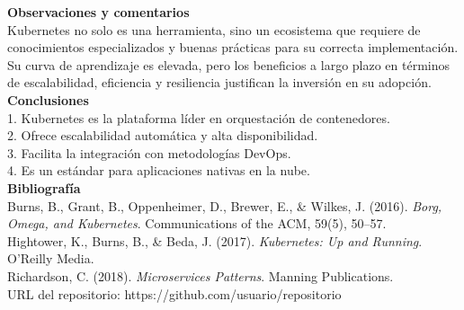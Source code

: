 \documentclass[12pt,letterpaper]{article}
\begin{document}
\textbf{Observaciones y comentarios} \\
Kubernetes no solo es una herramienta, sino un ecosistema que requiere de conocimientos especializados y buenas prácticas para su correcta implementación. Su curva de aprendizaje es elevada, pero los beneficios a largo plazo en términos de escalabilidad, eficiencia y resiliencia justifican la inversión en su adopción. \\

\textbf{Conclusiones} \\
1. Kubernetes es la plataforma líder en orquestación de contenedores. \\
2. Ofrece escalabilidad automática y alta disponibilidad. \\
3. Facilita la integración con metodologías DevOps. \\
4. Es un estándar para aplicaciones nativas en la nube. \\

\textbf{Bibliografía} \\
Burns, B., Grant, B., Oppenheimer, D., Brewer, E., & Wilkes, J. (2016). \textit{Borg, Omega, and Kubernetes}. Communications of the ACM, 59(5), 50–57. \\
Hightower, K., Burns, B., & Beda, J. (2017). \textit{Kubernetes: Up and Running}. O’Reilly Media. \\
Richardson, C. (2018). \textit{Microservices Patterns}. Manning Publications. \\

URL del repositorio: https://github.com/usuario/repositorio 
\end{document}

